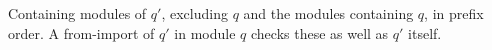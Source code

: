 Containing modules of $q'$, excluding $q$ and the modules containing $q$, in prefix order. A from-import of $q'$ in
module $q$ checks these as well as $q'$ itself.
